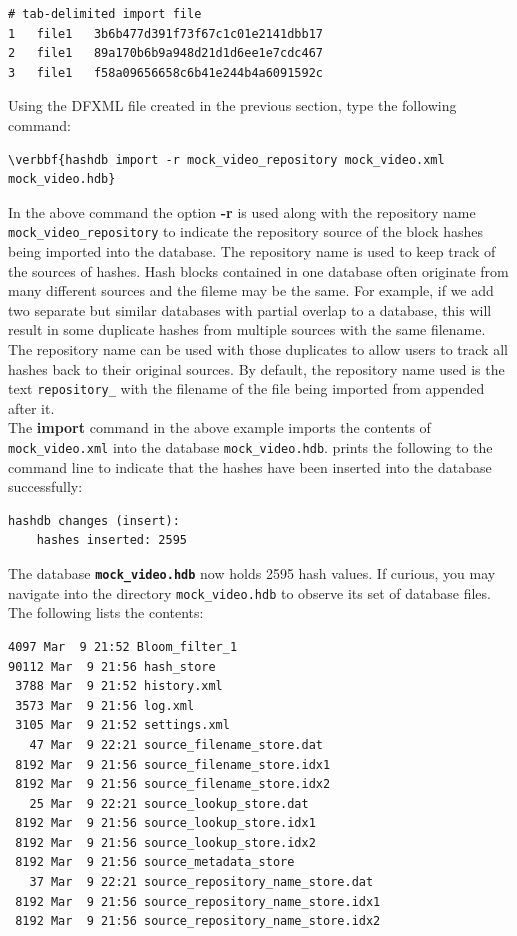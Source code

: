 \documentclass[11pt,fleqn]{article} %
\begin{document}
\lstset{style=customfile}
\begin{lstlisting}[float, caption={Example content of a tab-delimited import file}, label=importTabFile]
# tab-delimited import file
1	file1	3b6b477d391f73f67c1c01e2141dbb17
2	file1	89a170b6b9a948d21d1d6ee1e7cdc467
3	file1	f58a09656658c6b41e244b4a6091592c
\end{lstlisting}


Using the DFXML file created in the previous section, type the following command:
\begin{Verbatim}[commandchars=\\\{\}]
\verbbf{hashdb import -r mock_video_repository mock_video.xml mock_video.hdb}
\end{Verbatim}
In the above command the option \textbf{-r} is used along with the repository name \texttt{mock\_video\_repository} to indicate the repository source of the block hashes being imported into the database. The repository name is used to keep track of the sources of hashes. Hash blocks contained in one database often originate from many different sources and the fileme may be the same. For example, if we add two separate but similar databases with partial overlap to a database, this will result in some duplicate hashes from multiple sources with the same filename. The repository name can be used with those duplicates to allow users to track all hashes back to their original sources. By default, the repository name used is the text \texttt{repository\_} with the filename of the file being imported from appended after it.\\

The \textbf{import} command in the above example imports the contents of \texttt{mock\_video.xml} into the database \texttt{mock\_video.hdb}. \hash prints the following to the command line to indicate that the hashes have been inserted into the database successfully: 

\begingroup
\footnotesize
\begin{Verbatim}[fontfamily=courier]
hashdb changes (insert):
    hashes inserted: 2595
\end{Verbatim}
\endgroup
The database \texttt{\textbf{mock\_video.hdb}} now holds 2595 hash values.
If curious, you may navigate into the directory \texttt{mock\_video.hdb} to observe its set of database files. The following lists the contents:
\begingroup
\footnotesize
\begin{Verbatim}[fontfamily=courier]
 4097 Mar  9 21:52 Bloom_filter_1
90112 Mar  9 21:56 hash_store
 3788 Mar  9 21:52 history.xml
 3573 Mar  9 21:56 log.xml
 3105 Mar  9 21:52 settings.xml
   47 Mar  9 22:21 source_filename_store.dat
 8192 Mar  9 21:56 source_filename_store.idx1
 8192 Mar  9 21:56 source_filename_store.idx2
   25 Mar  9 22:21 source_lookup_store.dat
 8192 Mar  9 21:56 source_lookup_store.idx1
 8192 Mar  9 21:56 source_lookup_store.idx2
 8192 Mar  9 21:56 source_metadata_store
   37 Mar  9 22:21 source_repository_name_store.dat
 8192 Mar  9 21:56 source_repository_name_store.idx1
 8192 Mar  9 21:56 source_repository_name_store.idx2
\end{Verbatim}
\endgroup
\end{document}
